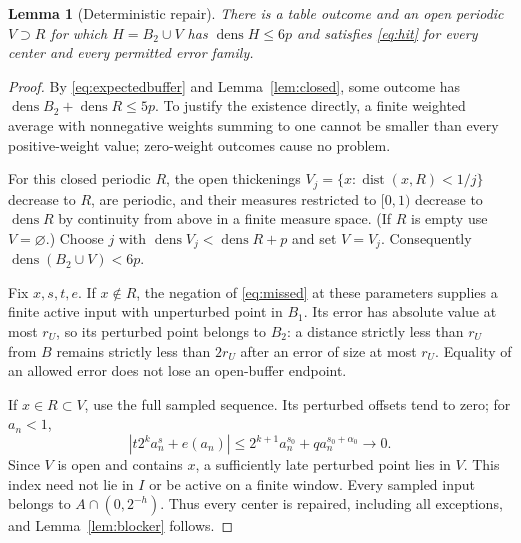 \documentclass[11pt]{article}
\newtheorem{lemma}[theorem]{Lemma}
\theoremstyle{definition}
\theoremstyle{remark}
\newcommand{\dens}{\operatorname{dens}}
\newcommand{\dist}{\operatorname{dist}}
\begin{document}
\begin{lemma}[Deterministic repair]\label{lem:repair}
There is a table outcome and an open periodic $V\supset R$ for which
$H=B_2\cup V$ has $\dens H\leq6p$ and satisfies \eqref{eq:hit} for every
center and every permitted error family.
\end{lemma}
\begin{proof}
By \eqref{eq:expectedbuffer} and Lemma~\ref{lem:closed}, some outcome has
$\dens B_2+\dens R\leq5p$. To justify the existence directly, a finite
weighted average with nonnegative weights summing to one cannot be smaller
than every positive-weight value; zero-weight outcomes cause no problem.

For this closed periodic $R$, the open thickenings
$V_j=\{x:\dist(x,R)<1/j\}$ decrease to $R$, are periodic, and their measures
restricted to $[0,1)$ decrease to $\dens R$ by continuity from above in a
finite measure space. (If $R$ is empty use $V=\varnothing$.) Choose $j$ with
$\dens V_j<\dens R+p$ and set $V=V_j$. Consequently
$\dens(B_2\cup V)<6p$.

Fix $x,s,t,e$. If $x\notin R$, the negation of \eqref{eq:missed} at these
parameters supplies a finite active input with unperturbed point in $B_1$.
Its error has absolute value at most $r_U$, so its perturbed point belongs
to $B_2$: a distance strictly less than $r_U$ from $B$ remains strictly less
than $2r_U$ after an error of size at most $r_U$. Equality of an allowed
error does not lose an open-buffer endpoint.

If $x\in R\subset V$, use the full sampled sequence. Its perturbed offsets
tend to zero; for $a_n<1$,
\[
 |t2^k a_n^s+e(a_n)|
 \leq2^{k+1}a_n^{s_0}+q a_n^{s_0+\alpha_0}\longrightarrow0.
\]
Since $V$ is open and contains $x$, a sufficiently late perturbed point lies
in $V$. This index need not lie in $I$ or be active on a finite window.
Every sampled input belongs to $A\cap(0,2^{-h})$. Thus every center is
repaired, including all exceptions, and Lemma~\ref{lem:blocker} follows.
\end{proof}
\end{document}
